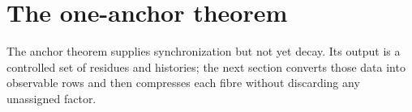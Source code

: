 \section{The one-anchor theorem}

The anchor theorem supplies synchronization but not yet decay.  Its output is a controlled set of residues and histories; the next section converts those data into observable rows and then compresses each fibre without discarding any unassigned factor.
